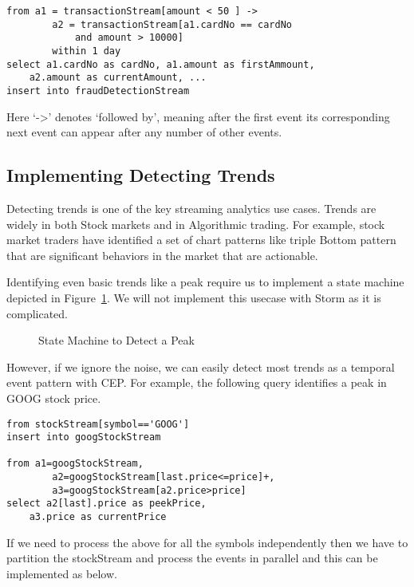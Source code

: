\documentclass{sig-alternate}
\begin{document}
{\begin{lstlisting}[mathescape, showstringspaces=false]
from a1 = transactionStream[amount < 50 ] -> 
        a2 = transactionStream[a1.cardNo == cardNo 
        	and amount > 10000]
        within 1 day
select a1.cardNo as cardNo, a1.amount as firstAmmount, 
	a2.amount as currentAmount, ...
insert into fraudDetectionStream
\end{lstlisting} 

Here `->' denotes `followed by', meaning after the first event its corresponding next event can appear after any number of other events. 


\subsection{Implementing Detecting Trends}

Detecting trends is one of the key streaming analytics use cases. Trends are widely in both Stock markets and in Algorithmic trading. For example, stock market traders have identified a set of chart patterns like triple Bottom pattern~\cite{bulkowski2011encyclopedia} that are significant behaviors in the market that are actionable. 

Identifying even basic trends like a peak require us to implement a state machine depicted in Figure~\ref{fig:q4}. We will not implement this usecase with Storm as it is complicated. 

\begin{figure}[!htbp]
\centering
{}
\caption{State Machine to Detect a Peak}
\label{fig:q4}
\end{figure}

However, if we ignore the noise, we can easily detect most trends as a temporal event pattern with CEP. For example, the following query identifies a peak in GOOG stock price. 


\begin{lstlisting}[mathescape, showstringspaces=false]
from stockStream[symbol=='GOOG'] 
insert into googStockStream

from a1=googStockStream, 
        a2=googStockStream[last.price<=price]+,
        a3=googStockStream[a2.price>price]
select a2[last].price as peekPrice, 
	a3.price as currentPrice
\end{lstlisting} 

If we need to process the above for all the symbols independently then we have to partition the stockStream and process the events in parallel and this can be implemented as below.

}
\end{document}
